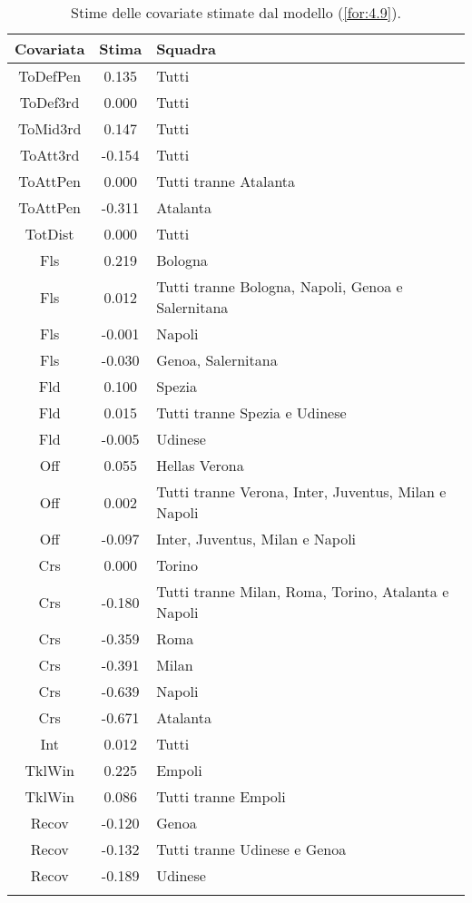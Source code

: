 \begin{table}[!htbp]%
	
	\renewcommand{\arraystretch}{1.7}
	\centering
	\begin{tabular}{ccp{10cm}}
		\hline	
		\rowcolor{SchoolColor2}		
		\textbf{Covariata} & \textbf{Stima} & \textbf{Squadra} \\	
		\hline
		ToDefPen & 0.135 & Tutti \\      
		ToDef3rd & 0.000 & Tutti \\
		ToMid3rd & 0.147 &Tutti\\
		ToAtt3rd & -0.154 & Tutti \\  
		ToAttPen & 0.000 & Tutti tranne Atalanta \\    
		ToAttPen & -0.311 & Atalanta \\ 	     	 
		TotDist & 0.000 & Tutti \\	
		Fls & 0.219 & Bologna  \\
		Fls & 0.012 & Tutti tranne Bologna, Napoli, Genoa e Salernitana  \\ 		
		Fls & -0.001 & Napoli  \\
		Fls & -0.030 & Genoa, Salernitana  \\
		Fld & 0.100 & Spezia \\
		Fld & 0.015 & Tutti tranne Spezia e Udinese  \\
		Fld & -0.005 & Udinese \\
		Off & 0.055 & Hellas Verona\\
		Off & 0.002 & Tutti tranne Verona, Inter, Juventus, Milan e Napoli\\
		Off & -0.097 & Inter, Juventus, Milan e Napoli  \\
		Crs & 0.000 & Torino\\
		Crs & -0.180 & Tutti tranne Milan, Roma, Torino, Atalanta e Napoli\\
		Crs & -0.359 & Roma\\
		Crs & -0.391 & Milan \\
		Crs & -0.639 & Napoli\\
		Crs & -0.671 & Atalanta \\
		Int & 0.012 & Tutti\\
		TklWin &  0.225 & Empoli  \\
		TklWin &  0.086 & Tutti tranne Empoli  \\ 
		Recov &  -0.120& Genoa \\ 
		Recov &  -0.132& Tutti tranne Udinese e Genoa \\ 
		Recov &  -0.189& Udinese \\ 
		\hline
		& &  \\
		
	\end{tabular} \hbox{}
	\caption{Stime delle covariate stimate dal modello (\ref{for:4.9}).} \label{tab:BTCL3} 
\end{table}
 
